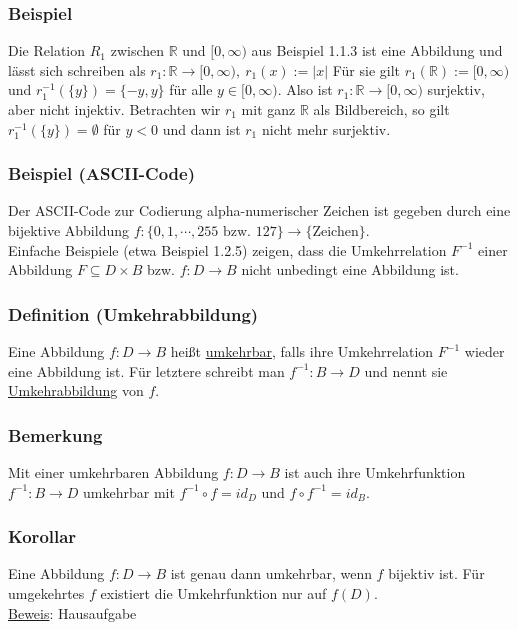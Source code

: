 \subsubsection{Beispiel}
Die Relation $R_1$ zwischen $\mathbb{R}$ und $[0,\infty )$ aus Beispiel 1.1.3 ist eine Abbildung und lässt sich schreiben als $r_1:\mathbb{R}\rightarrow [0,\infty ),\ r_1(x):=\left|x\right|$
F\"{u}r sie gilt $r_1(\mathbb{R}):=[0,\infty )$ und $r_1^{-1}(\{y\})=\{-y,y\}$ f\"{u}r alle $y\in [0,\infty )$.  Also ist $r_1:\mathbb{R}\rightarrow [0,\infty )$ surjektiv, aber nicht injektiv.  Betrachten wir $r_1$ mit ganz $\mathbb{R}$ als Bildbereich, so gilt $r_1^{-1}(\{y\})=\emptyset$ f\"{u}r $y<0$ und dann ist $r_1$ nicht mehr surjektiv.
\subsubsection{Beispiel (ASCII-Code)}
Der ASCII-Code zur Codierung alpha-numerischer Zeichen ist gegeben durch eine bijektive Abbildung $f:\{0,1,\cdots ,255\text{ bzw. $127$}\}\rightarrow \{$Zeichen$\}$.\\
Einfache Beispiele (etwa Beispiel 1.2.5) zeigen, dass die Umkehrrelation $F^{-1}$ einer Abbildung $F\subseteq D\times B$ bzw. $f:D\rightarrow B$ nicht unbedingt eine Abbildung ist.
\subsubsection{Definition (Umkehrabbildung)}
Eine Abbildung $f:D\rightarrow B$ heißt \underline{umkehrbar}, falls ihre Umkehrrelation $F^{-1}$ wieder eine Abbildung ist.  F\"{u}r letztere schreibt man $f^{-1}:B\rightarrow D$ und nennt sie \underline{Umkehrabbildung} von $f$.
\subsubsection{Bemerkung}
Mit einer umkehrbaren Abbildung $f:D\rightarrow B$ ist auch ihre Umkehrfunktion $f^{-1}:B\rightarrow D$ umkehrbar mit $f^{-1}\circ f = id_D$ und $f\circ f^{-1}=id_B$.
\subsubsection{Korollar}
Eine Abbildung $f:D\rightarrow B$ ist genau dann umkehrbar, wenn $f$ bijektiv ist.  F\"{u}r umgekehrtes $f$ existiert die Umkehrfunktion nur auf $f(D)$. \\
\underline{Beweis}: Hausaufgabe
